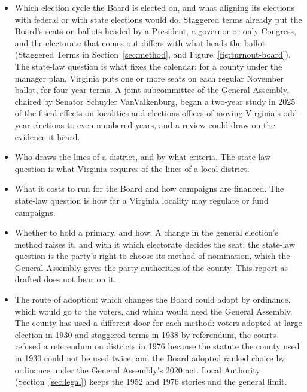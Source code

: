 \begin{itemize}
  \item Which election cycle the Board is elected on, and what aligning its
  elections with federal or with state elections would do. Staggered terms
  already put the Board's seats on ballots headed by a President, a governor or
  only Congress, and the electorate that comes out differs with what heads the
  ballot (Staggered Terms in Section~\ref{sec:method}, and
  Figure~\ref{fig:turnout-board}). The state-law question is what fixes the
  calendar: for a county under the manager plan, Virginia puts one or more seats
  on each regular November ballot, for four-year terms.\autocite{vacode152705}
  A joint subcommittee of the General Assembly, chaired by Senator Schuyler
  VanValkenburg, began a two-year study in 2025 of the fiscal effects on
  localities and elections offices of moving Virginia's odd-year elections to even-numbered years, and a
  review could draw on the evidence it heard.\autocite{vajointsubgenelections2025agenda}
  \item Who draws the lines of a district, and by what criteria. The state-law
  question is what Virginia requires of the lines of a local district.
  \item What it costs to run for the Board and how campaigns are financed. The
  state-law question is how far a Virginia locality may regulate or fund campaigns.
  \item Whether to hold a primary, and how. A change in the general election's
  method raises it, and with it which electorate decides the seat; the state-law
  question is the party's right to choose its method of nomination, which the
  General Assembly gives the party authorities of the county.\autocite{vacode24}
  This report as drafted does not bear on it.
  \item The route of adoption: which changes the Board could adopt by ordinance,
  which would go to the voters, and which would need the General Assembly. The
  county has used a different door for each method: voters adopted at-large
  election in 1930 and staggered terms in 1938 by referendum, the courts refused a
  referendum on districts in 1976 because the statute the county used in 1930
  could not be used twice, and the Board adopted ranked choice by ordinance under
  the General Assembly's 2020
  act.\autocite[194--196]{rose1976}\fnsep\autocite[11]{arlingtonelections2021}\fnsep\autocite{vollinelectoralboard}\fnsep\autocite{vaacts2020c713}
  Local Authority (Section~\ref{sec:legal}) keeps the 1952 and 1976 stories and the
  general limit.
\end{itemize}

